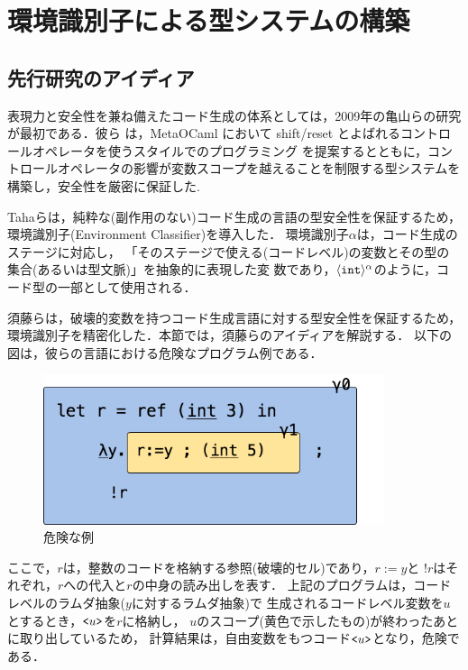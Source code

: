 \chapter{環境識別子による型システムの構築}

\section{先行研究のアイディア}
表現力と安全性を兼ね備えたコード生成の体系としては，2009年の亀山らの研究\cite{Kameyama2009}が最初である．彼ら は，MetaOCaml において shift/reset とよばれるコントロールオペレータを使うスタイルでのプログラミング を提案するとともに，コントロールオペレータの影響が変数スコープを越えることを制限する型システムを構築し，安全性を厳密に保証した.

Tahaら\cite{Taha:2003:EC:604131.604134}は，純粋な(副作用のない)コード生成の言語の型安全性を保証するため，
環境識別子(Environment Classifier)を導入した．
環境識別子$\alpha$は，コード生成のステージに対応し，
「そのステージで使える(コードレベル)の変数とその型の集合(あるいは型文脈)」を抽象的に表現した変
数であり，$\langle{\mbox{\texttt{int}}}\rangle^{\alpha}$のように，コード型の一部として使用される．

須藤ら\cite{Sudo2014}は，破壊的変数を持つコード生成言語に対する型安全性を保証するため，
環境識別子を精密化した．本節では，須藤らのアイディアを解説する．
以下の図は，彼らの言語における危険なプログラム例である．

\begin{figure}[ht]
  \centering
  \includegraphics[clip,width=10cm]{./img/sudo_ref.png}
  \caption{危険な例}
  \label{fig:sudo_ref}
\end{figure}


ここで，$r$は，整数のコードを格納する参照(破壊的セル)であり，$r:=y$と
$!r$はそれぞれ，$r$への代入と$r$の中身の読み出しを表す．
上記のプログラムは，コードレベルのラムダ抽象($y$に対するラムダ抽象)で
生成されるコードレベル変数を$u$とするとき，$\texttt{<}{u}\texttt{>}$を$r$に格納し，
$u$のスコープ(黄色で示したもの)が終わったあとに取り出しているため，
計算結果は，自由変数をもつコード$\texttt{<}{u}\texttt{>}$となり，危険である．

